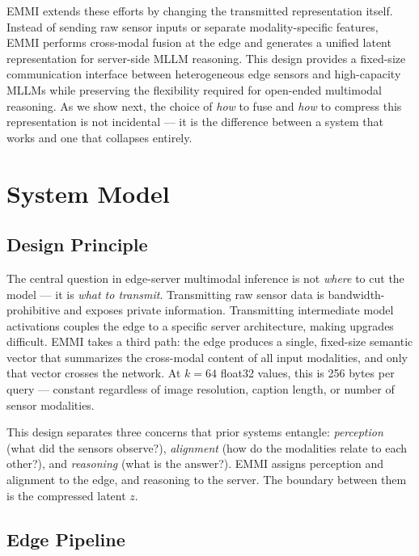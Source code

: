 \documentclass[10pt,twocolumn]{article}
\begin{document}
EMMI extends these efforts by changing the transmitted representation itself.
Instead of sending raw sensor inputs or separate modality-specific features,
EMMI performs cross-modal fusion at the edge and generates a unified latent
representation for server-side MLLM reasoning. This design provides a
fixed-size communication interface between heterogeneous edge sensors and
high-capacity MLLMs while preserving the flexibility required for open-ended
multimodal reasoning. As we show next, the choice of \emph{how} to fuse and
\emph{how} to compress this representation is not incidental --- it is the
difference between a system that works and one that collapses entirely.


\section{System Model}
\label{sec:system}

\subsection{Design Principle}

The central question in edge-server multimodal inference is not
\emph{where} to cut the model --- it is \emph{what to transmit}.
Transmitting raw sensor data is bandwidth-prohibitive and exposes
private information. Transmitting intermediate model activations couples
the edge to a specific server architecture, making upgrades difficult.
EMMI takes a third path: the edge produces a single, fixed-size semantic
vector that summarizes the cross-modal content of all input modalities,
and only that vector crosses the network. At $k{=}64$ float32 values,
this is 256 bytes per query --- constant regardless of image resolution,
caption length, or number of sensor modalities.

This design separates three concerns that prior systems entangle:
\emph{perception} (what did the sensors observe?),
\emph{alignment} (how do the modalities relate to each other?), and
\emph{reasoning} (what is the answer?).
EMMI assigns perception and alignment to the edge, and reasoning to the
server. The boundary between them is the compressed latent $z$.

\subsection{Edge Pipeline}
\end{document}
